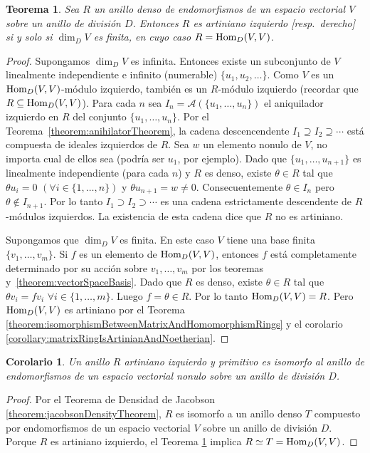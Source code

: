 \documentclass{report}
\newcommand{\Hom}{\textnormal{Hom}}
\newtheorem{theorem}{Teorema}
\newtheorem{corollary}{Corolario}
\begin{document}
  \begin{theorem}\label{theorem:leftArtinianDenseEndomorphismRingsOfVectorSpaces}
    Sea \(R\) un anillo denso de endomorfismos de un espacio vectorial \(V\) sobre un anillo de división \(D\).
    Entonces \(R\) es artiniano izquierdo [resp.\ derecho] si y solo si \(\dim_D V\) es finita, en cuyo caso \(R = \Hom_D(V, V)\).
  \end{theorem}
  \begin{proof}
    Supongamos \(\dim_D V\) es infinita.
    Entonces existe un subconjunto de \(V\) linealmente independiente e infinito (numerable) \(\{u_1, u_2, \dots\}\).
    Como \(V\) es un \(\Hom_D(V, V)\)-módulo izquierdo, también es un \(R\)-módulo izquierdo (recordar que \(R \subseteq \Hom_D(V, V)\)).
    Para cada \(n\) sea \(I_n = \mathcal{A}(\{u_1, \dots, u_n\})\) el aniquilador izquierdo en \(R\) del conjunto \(\{u_1, \dots, u_n\}\).
    Por el Teorema~\ref{theorem:anihilatorTheorem}, la cadena descencendente \(I_1 \supseteq I_2 \supseteq \cdots\) está compuesta de ideales izquierdos de \(R\).
    Sea \(w\) un elemento nonulo de \(V\), no importa cual de ellos sea (podría ser \(u_1\), por ejemplo).
    Dado que \(\{u_1, \dots, u_{n + 1}\}\) es linealmente independiente (para cada \(n\)) y \(R\) es denso, existe \(\theta \in R\) tal que \(\theta u_i = 0\) \((\forall i \in \{1, \dots, n\})\) y \(\theta u_{n + 1} = w \neq 0\).
    Consecuentemente \(\theta \in I_n\) pero \(\theta \notin I_{n + 1}\).
    Por lo tanto \(I_1 \supset I_2 \supset \cdots\) es una cadena estrictamente descendente de \(R\)-módulos izquierdos.
    La existencia de esta cadena dice que \(R\) no es artiniano.

    Supongamos que \(\dim_D V\) es finita.
    En este caso \(V\) tiene una base finita \(\{v_1, \dots, v_m\}\).
    Si \(f\) es un elemento de \(\Hom_D(V, V)\), entonces \(f\) está completamente determinado por su acción sobre \(v_1, \dots, v_m\) por los teoremas%
     y~\ref{theorem:vectorSpaceBasis}.
    Dado que \(R\) es denso, existe \(\theta \in R\) tal que \(\theta v_i = f v_i\) \(\forall i \in \{1, \dots, m\}\).
    Luego \(f = \theta \in R\).
    Por lo tanto \(\Hom_D(V, V) = R\).
    Pero \(\Hom_D(V, V)\) es artiniano por el Teorema \ref{theorem:isomorphismBetweenMatrixAndHomomorphismRings} y el corolario \ref{corollary:matrixRingIsArtinianAndNoetherian}.
  \end{proof}

  \begin{corollary}\label{corollary:leftArtinianPrimitiveRingsAreRingsOfEndomorphisms}
    Un anillo \(R\) artiniano izquierdo y primitivo es isomorfo al anillo de endomorfismos de un espacio vectorial nonulo sobre un anillo de división \(D\).
  \end{corollary}
  \begin{proof}
    Por el Teorema de Densidad de Jacobson \ref{theorem:jacobsonDensityTheorem}, \(R\) es isomorfo a un anillo denso \(T\) compuesto por endomorfismos de un espacio vectorial \(V\) sobre un anillo de división \(D\).
    Porque \(R\) es artiniano izquierdo, el Teorema \ref{theorem:leftArtinianDenseEndomorphismRingsOfVectorSpaces} implica \(R \simeq T = \Hom _D(V, V)\).
  \end{proof}
\end{document}
